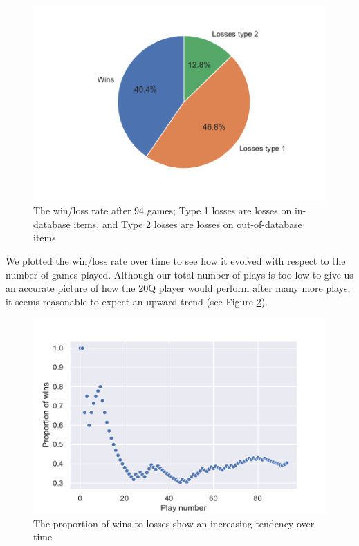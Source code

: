\documentclass[11pt,a4paper]{article}
\begin{document}
\begin{figure}
    \centering
    \includegraphics[width=\linewidth]{graphics/pie_detailed-winsLosses.pdf}
    \caption{The win/loss rate after 94 games; Type 1 losses are losses on in-database items, and Type 2 losses are losses on out-of-database items}
    \label{fig:wins-losses}
\end{figure}

We plotted the win/loss rate over time to see how it evolved with respect to the number of games played. 
Although our total number of plays is too low to give us an accurate picture of how the 20Q player would perform after many more plays, it seems reasonable to expect an upward trend (see Figure \ref{fig:win-over-time}).

\begin{figure}
    \centering
    \includegraphics[scale = .5]{graphics/stats-eval.pdf}
    \caption{The proportion of wins to losses show an increasing tendency over time}
    \label{fig:win-over-time}
\end{figure}
\end{document}
